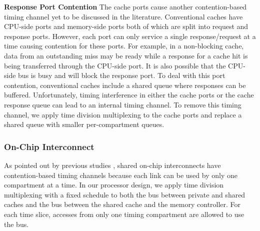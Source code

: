 \textbf{Response Port Contention}
The cache ports cause another contention-based timing channel yet to be 
discussed in the literature. Conventional caches have CPU-side ports and 
memory-side ports both of which are split into request and response ports. 
However, each port can only service a single response/request at a time
causing contention for these ports. For example, in a non-blocking cache,
data from an outstanding miss may be ready while a response for a cache hit
is being transferred through the CPU-side port.
It is also possible that the CPU-side bus is busy and will block the response
port. 
To deal with this port contention, conventional caches include a shared queue
where responses can be buffered. Unfortunately, 
timing interference in either the cache ports or the cache response queue can
lead to an internal timing channel. To remove this timing channel, we apply
time division multiplexing to the cache ports and replace a shared queue with
smaller per-compartment queues.

\subsubsection{On-Chip Interconnect}

As pointed out by previous studies \cite{yaonocs, surfnoc}, shared on-chip 
interconnects
have contention-based timing channels because each link can be used by only 
one compartment at a time. In our processor design, we apply time
division multiplexing with a fixed schedule to both the bus between private
and shared caches and the bus between the shared cache and the memory controller.
For each time slice, accesses from only one timing compartment are allowed to
use the bus.

